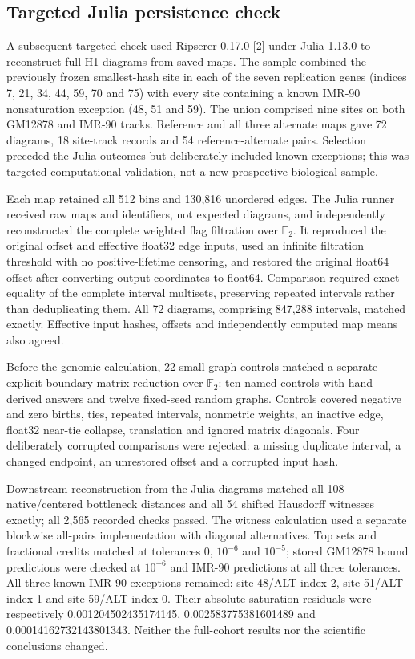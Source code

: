 \documentclass[
  11pt,
]{article}
\begin{document}
\subsection{Targeted Julia persistence
check}\label{targeted-julia-persistence-check}

A subsequent targeted check used Ripserer 0.17.0 {[}2{]} under Julia
1.13.0 to reconstruct full H1 diagrams from saved maps. The sample
combined the previously frozen smallest-hash site in each of the seven
replication genes (indices 7, 21, 34, 44, 59, 70 and 75) with every site
containing a known IMR-90 nonsaturation exception (48, 51 and 59). The
union comprised nine sites on both GM12878 and IMR-90 tracks. Reference
and all three alternate maps gave 72 diagrams, 18 site-track records and
54 reference-alternate pairs. Selection preceded the Julia outcomes but
deliberately included known exceptions; this was targeted computational
validation, not a new prospective biological sample.

Each map retained all 512 bins and 130,816 unordered edges. The Julia
runner received raw maps and identifiers, not expected diagrams, and
independently reconstructed the complete weighted flag filtration over
\(\mathbb{F}_2\). It reproduced the original offset and effective
float32 edge inputs, used an infinite filtration threshold with no
positive-lifetime censoring, and restored the original float64 offset
after converting output coordinates to float64. Comparison required
exact equality of the complete interval multisets, preserving repeated
intervals rather than deduplicating them. All 72 diagrams, comprising
847,288 intervals, matched exactly. Effective input hashes, offsets and
independently computed map means also agreed.

Before the genomic calculation, 22 small-graph controls matched a
separate explicit boundary-matrix reduction over \(\mathbb{F}_2\): ten
named controls with hand-derived answers and twelve fixed-seed random
graphs. Controls covered negative and zero births, ties, repeated
intervals, nonmetric weights, an inactive edge, float32 near-tie
collapse, translation and ignored matrix diagonals. Four deliberately
corrupted comparisons were rejected: a missing duplicate interval, a
changed endpoint, an unrestored offset and a corrupted input hash.

Downstream reconstruction from the Julia diagrams matched all 108
native/centered bottleneck distances and all 54 shifted Hausdorff
witnesses exactly; all 2,565 recorded checks passed. The witness
calculation used a separate blockwise all-pairs implementation with
diagonal alternatives. Top sets and fractional credits matched at
tolerances 0, \(10^{-6}\) and \(10^{-5}\); stored GM12878 bound
predictions were checked at \(10^{-6}\) and IMR-90 predictions at all
three tolerances. All three known IMR-90 exceptions remained: site
48/ALT index 2, site 51/ALT index 1 and site 59/ALT index 0. Their
absolute saturation residuals were respectively 0.001204502435174145,
0.002583775381601489 and 0.00014162732143801343. Neither the full-cohort
results nor the scientific conclusions changed.
\end{document}
